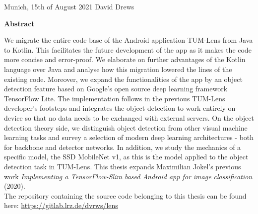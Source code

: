 \documentclass[
			   fontsize=11pt,
               paper=a4,
               bibliography=totoc,
               idxtotoc,
               headsepline,
               footsepline,
               footinclude=false,
               BCOR=12mm,
               DIV=13,
               openany,   %
               oneside    %
               ]
               {scrbook}
\def\author{David Drews}
\def\date{15th of August 2021}
\begin{document}
\vspace{15mm}
\noindent
Munich, \date \hspace{5cm} \author
\cleardoubleemptypage


{}
\vspace*{2cm}
\begin{center}
    {\Large \textbf {Abstract}}
\end{center}
\vspace{1cm}

We migrate the entire code base of the Android application TUM-Lens from Java to Kotlin. This facilitates the future development of the app as it makes the code more concise and error-proof. We elaborate on further advantages of the Kotlin language over Java and analyse how this migration lowered the lines of the existing code. Moreover, we expand the functionalities of the app by an object detection feature based on Google's open source deep learning framework TensorFlow Lite. The implementation follows in the previous TUM-Lens developer's footsteps and integrates the object detection to work entirely on-device so that no data needs to be exchanged with external servers. On the object detection theory side, we distinguish object detection from other visual machine learning tasks and survey a selection of modern deep learning architectures - both for backbone and detector networks. In addition, we study the mechanics of a specific model, the SSD MobileNet v1, as this is the model applied to the object detection task in TUM-Lens. This thesis expands Maximilian Jokel's previous work \textit{Implementing a TensorFlow-Slim based Android app for image classification} (2020). \\

\noindent The repository containing the source code belonging to this thesis can be found here: \url{https://gitlab.lrz.de/dvrws/lens}

\cleardoublepage

\end{document}
